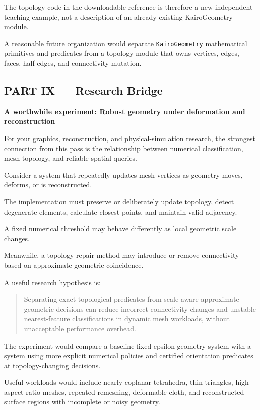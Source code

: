 The topology code in the downloadable reference is therefore a new independent teaching example, not a description of an already-existing KairoGeometry module.

A reasonable future organization would separate \texttt{KairoGeometry} mathematical primitives and predicates from a topology module that owns vertices, edges, faces, half-edges, and connectivity mutation.

\subsection{PART IX --- Research Bridge}\label{04-visual-computing-ii-ch023-part-ix-research-bridge}

\textbf{A worthwhile experiment: Robust geometry under deformation and reconstruction}

For your graphics, reconstruction, and physical-simulation research, the strongest connection from this pass is the relationship between numerical classification, mesh topology, and reliable spatial queries.

Consider a system that repeatedly updates mesh vertices as geometry moves, deforms, or is reconstructed.

The implementation must preserve or deliberately update topology, detect degenerate elements, calculate closest points, and maintain valid adjacency.

A fixed numerical threshold may behave differently as local geometric scale changes.

Meanwhile, a topology repair method may introduce or remove connectivity based on approximate geometric coincidence.

A useful research hypothesis is:

\begin{quote}
Separating exact topological predicates from scale-aware approximate geometric decisions can reduce incorrect connectivity changes and unstable nearest-feature classifications in dynamic mesh workloads, without unacceptable performance overhead.
\end{quote}

The experiment would compare a baseline fixed-epsilon geometry system with a system using more explicit numerical policies and certified orientation predicates at topology-changing decisions.

Useful workloads would include nearly coplanar tetrahedra, thin triangles, high-aspect-ratio meshes, repeated remeshing, deformable cloth, and reconstructed surface regions with incomplete or noisy geometry.

